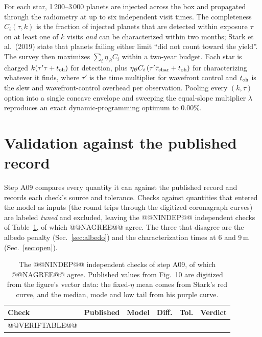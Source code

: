 \documentclass[11pt,a4paper]{article}
\begin{document}
For each star, 1\,200--3\,000 planets are injected across the box and propagated through the
radiometry at up to six independent visit times. The completeness $C_i(\tau, k)$ is the fraction
of injected planets that are detected within exposure $\tau$ on at least one of $k$ visits
\emph{and} can be characterized within two months; Stark et al.\ (2019) state that planets failing
either limit ``did not count toward the yield''. The survey then maximizes
$\sum_i \eta_\mathcal{B} C_i$ within a two-year budget. Each star is charged
$k(\tau'\tau + t_{\rm oh})$ for detection, plus
$\eta_\mathcal{B} C_i\,(\tau'\bar{\tau}_{\rm char} + t_{\rm oh})$ for characterizing whatever it
finds, where $\tau'$ is the time multiplier for wavefront control and $t_{\rm oh}$ is the slew and
wavefront-control overhead per observation. Pooling every $(k, \tau)$ option into a single concave
envelope and sweeping the equal-slope multiplier $\lambda$ reproduces an exact
dynamic-programming optimum to 0.00\%.

\section{Validation against the published record}
\label{sec:validation}

Step A09 compares every quantity it can against the published record and records each check's
source and tolerance. Checks against quantities that entered the model as inputs (the round trips
through the digitized coronagraph curves) are labeled \emph{tuned} and excluded, leaving the
@@NINDEP@@ independent checks of Table~\ref{tab:verif}, of which @@NAGREE@@ agree. The three that
disagree are the albedo penalty (Sec.~\ref{sec:albedo}) and the characterization times at 6 and
9\,m (Sec.~\ref{sec:open}).

\begin{table}[htbp]
\centering
\scriptsize
\begin{tabular}{p{5.4cm}rrrrl}
\toprule
\textbf{Check} & \textbf{Published} & \textbf{Model} & \textbf{Diff.} & \textbf{Tol.} & \textbf{Verdict} \\
\midrule
@@VERIFTABLE@@
\bottomrule
\end{tabular}
\caption{The @@NINDEP@@ independent checks of step A09, of which @@NAGREE@@ agree. Published
values from Fig.~10 are digitized from the figure's vector data: the fixed-$\eta$ mean comes from
Stark's red curve, and the median, mode and low tail from his purple curve.}
\label{tab:verif}
\end{table}
\end{document}
